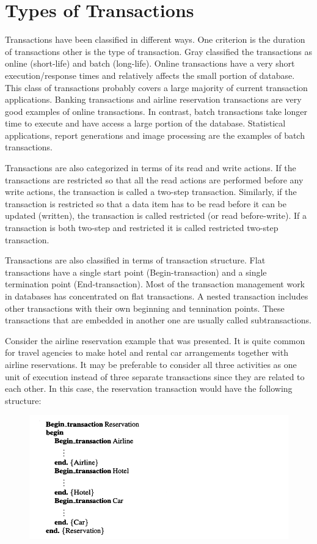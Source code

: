 \documentclass{article}
\begin{document}
\section*{Types of Transactions}

Transactions have been classified in different ways. One criterion is the duration of transactions other is the type of transaction. Gray classified the transactions as online (short-life) and batch (long-life). Online transactions have a very short execution/response times and relatively affects the small portion of database. This class of transactions probably covers a large majority of current transaction applications. Banking transactions and airline reservation transactions are very good examples of online transactions. In contrast, batch transactions take longer time to execute and have access a large portion of the database. Statistical applications, report generations and image processing are the examples of batch transactions. 


Transactions are also categorized in terms of its read and write actions. If the transactions are restricted so that all the read actions are performed before any write actions, the transaction is called a two-step transaction. Similarly, if the transaction is restricted so that a data item has to be read before it can be updated (written), the transaction is called restricted (or read before-write). If a transaction is both two-step and restricted it is called restricted two-step transaction.

Transactions are also classified in terms of transaction structure.  Flat transactions have a single start point (Begin-transaction) and a single termination point (End-transaction). Most of the transaction management work in databases has concentrated on flat transactions. A nested transaction includes other transactions with their own beginning and tennination points. These transactions that are embedded in another one 
are usually called subtransactions. 


Consider the airline reservation example that was presented. It is quite common for travel agencies to make hotel and rental car arrangements together with airline reservations. It may be preferable to consider all three activities as one unit of execution instead of three separate transactions since they are related to each other. In this case, the reservation transaction would have the following structure:

\begin{figure}[h]
 \centering
 \includegraphics{nested}
\end{figure}
\end{document}
